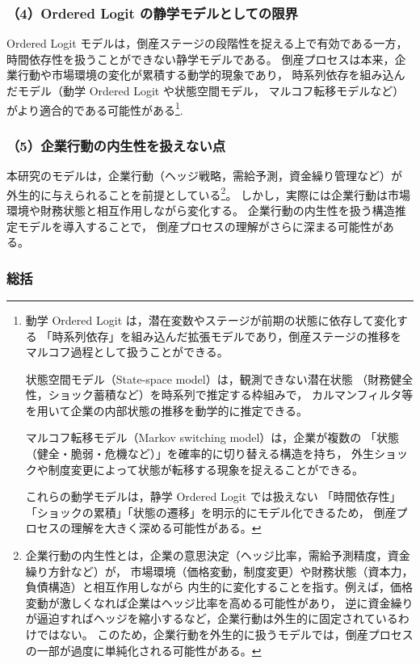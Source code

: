 \subsubsection*{（4）Ordered Logit の静学モデルとしての限界}

Ordered Logit モデルは，倒産ステージの段階性を捉える上で有効である一方，
時間依存性を扱うことができない静学モデルである。
倒産プロセスは本来，企業行動や市場環境の変化が累積する動学的現象であり，
時系列依存を組み込んだモデル（動学 Ordered Logit や状態空間モデル，
マルコフ転移モデルなど）がより適合的である可能性がある\footnote{
動学 Ordered Logit は，潜在変数やステージが前期の状態に依存して変化する
「時系列依存」を組み込んだ拡張モデルであり，倒産ステージの推移を
マルコフ過程として扱うことができる。

状態空間モデル（State-space model）は，観測できない潜在状態
（財務健全性，ショック蓄積など）を時系列で推定する枠組みで，
カルマンフィルタ等を用いて企業の内部状態の推移を動学的に推定できる。

マルコフ転移モデル（Markov switching model）は，企業が複数の
「状態（健全・脆弱・危機など）」を確率的に切り替える構造を持ち，
外生ショックや制度変更によって状態が転移する現象を捉えることができる。

これらの動学モデルは，静学 Ordered Logit では扱えない
「時間依存性」「ショックの累積」「状態の遷移」を明示的にモデル化できるため，
倒産プロセスの理解を大きく深める可能性がある。
}.


\subsubsection*{（5）企業行動の内生性を扱えない点}

本研究のモデルは，企業行動（ヘッジ戦略，需給予測，資金繰り管理など）が
外生的に与えられることを前提としている\footnote{
企業行動の内生性とは，企業の意思決定（ヘッジ比率，需給予測精度，資金繰り方針など）が，
市場環境（価格変動，制度変更）や財務状態（資本力，負債構造）と相互作用しながら
内生的に変化することを指す。例えば，価格変動が激しくなれば企業はヘッジ比率を高める可能性があり，
逆に資金繰りが逼迫すればヘッジを縮小するなど，企業行動は外生的に固定されているわけではない。
このため，企業行動を外生的に扱うモデルでは，倒産プロセスの一部が過度に単純化される可能性がある。
}。
しかし，実際には企業行動は市場環境や財務状態と相互作用しながら変化する。
企業行動の内生性を扱う構造推定モデルを導入することで，
倒産プロセスの理解がさらに深まる可能性がある。

\subsubsection*{総括}

